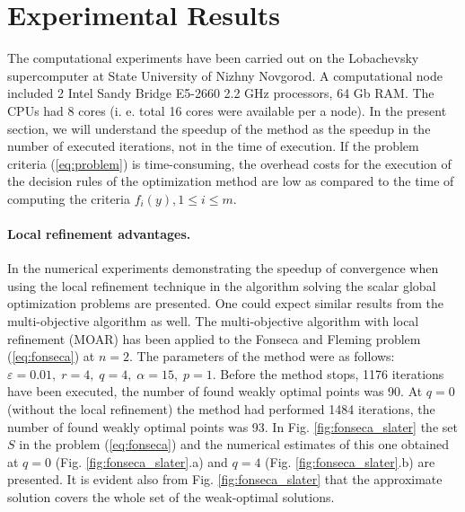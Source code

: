 \documentclass{llncs}
\begin{document}
\section{Experimental Results}
The computational experiments have been carried out on the Lobachevsky supercomputer at
State University of Nizhny Novgorod. A computational node included 2 Intel
Sandy Bridge E5-2660 2.2 GHz processors, 64 Gb RAM. The CPUs had 8 cores (i. e. total 16 cores
were available per a node).
In the present section, we will understand the speedup of the method as the speedup in the
number of executed iterations, not in the time of execution. If the problem
criteria (\ref{eq:problem}) is time-consuming, the overhead costs for the execution of the
decision rules of the optimization method are low as compared to the time of computing the
criteria \(f_i(y), 1\leqslant i\leqslant m\).

\paragraph{Local refinement advantages.} In \cite{barkalovLebedev2016} the numerical
experiments demonstrating the speedup of convergence when using the local refinement
technique in the algorithm solving the scalar global optimization problems are presented. One
could expect similar results from the multi-objective algorithm as well. The multi-objective
algorithm with local refinement (MOAR) has been applied to the  Fonseca and Fleming
problem (\ref{eq:fonseca}) at \(n=2\). The parameters of the method were as follows:
\(\varepsilon=0.01,\;r=4,\;q=4,\;\alpha=15,\;p=1\). Before the method stops, 1176 iterations
have been executed, the number of found weakly optimal points was 90. At \(q=0\) (without the
local refinement) the method had performed 1484 iterations, the number of found weakly
optimal points was 93. In Fig. \ref{fig:fonseca_slater} the set \(S\) in the problem
(\ref{eq:fonseca}) and the numerical estimates of this one obtained at \(q=0\) (Fig.
\ref{fig:fonseca_slater}.a) and \(q=4\) (Fig. \ref{fig:fonseca_slater}.b) are presented. It is
evident also from Fig. \ref{fig:fonseca_slater} that the approximate solution covers the whole
set of the weak-optimal solutions.
\end{document}
